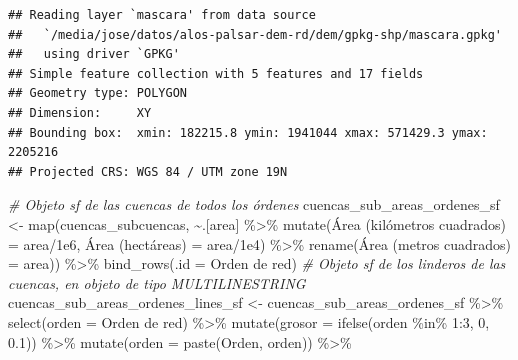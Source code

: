 \documentclass[spanish]{article}
\newenvironment{Shaded}{\begin{snugshade}}{\end{snugshade}}
\newcommand{\AttributeTok}[1]{\textcolor[rgb]{0.77,0.63,0.00}{#1}}
\newcommand{\CommentTok}[1]{\textcolor[rgb]{0.56,0.35,0.01}{\textit{#1}}}
\newcommand{\DecValTok}[1]{\textcolor[rgb]{0.00,0.00,0.81}{#1}}
\newcommand{\FloatTok}[1]{\textcolor[rgb]{0.00,0.00,0.81}{#1}}
\newcommand{\FunctionTok}[1]{\textcolor[rgb]{0.00,0.00,0.00}{#1}}
\newcommand{\NormalTok}[1]{#1}
\newcommand{\OtherTok}[1]{\textcolor[rgb]{0.56,0.35,0.01}{#1}}
\newcommand{\SpecialCharTok}[1]{\textcolor[rgb]{0.00,0.00,0.00}{#1}}
\newcommand{\StringTok}[1]{\textcolor[rgb]{0.31,0.60,0.02}{#1}}
\begin{document}
\begin{verbatim}
## Reading layer `mascara' from data source 
##   `/media/jose/datos/alos-palsar-dem-rd/dem/gpkg-shp/mascara.gpkg' 
##   using driver `GPKG'
## Simple feature collection with 5 features and 17 fields
## Geometry type: POLYGON
## Dimension:     XY
## Bounding box:  xmin: 182215.8 ymin: 1941044 xmax: 571429.3 ymax: 2205216
## Projected CRS: WGS 84 / UTM zone 19N
\end{verbatim}

\begin{Shaded}
\begin{Highlighting}[]
\CommentTok{\# Objeto sf de las cuencas de todos los órdenes}
\NormalTok{cuencas\_sub\_areas\_ordenes\_sf }\OtherTok{\textless{}{-}} \FunctionTok{map}\NormalTok{(cuencas\_subcuencas, }\SpecialCharTok{\textasciitilde{}}\NormalTok{.[}\StringTok{\textquotesingle{}area\textquotesingle{}}\NormalTok{] }\SpecialCharTok{\%\textgreater{}\%}
                           \FunctionTok{mutate}\NormalTok{(}\StringTok{\textasciigrave{}}\AttributeTok{Área (kilómetros cuadrados)}\StringTok{\textasciigrave{}} \OtherTok{=}\NormalTok{ area}\SpecialCharTok{/}\FloatTok{1e6}\NormalTok{,}
                                  \StringTok{\textasciigrave{}}\AttributeTok{Área (hectáreas)}\StringTok{\textasciigrave{}} \OtherTok{=}\NormalTok{ area}\SpecialCharTok{/}\FloatTok{1e4}\NormalTok{) }\SpecialCharTok{\%\textgreater{}\%} 
                           \FunctionTok{rename}\NormalTok{(}\StringTok{\textasciigrave{}}\AttributeTok{Área (metros cuadrados)}\StringTok{\textasciigrave{}} \OtherTok{=}\NormalTok{ area)) }\SpecialCharTok{\%\textgreater{}\%} 
  \FunctionTok{bind\_rows}\NormalTok{(}\AttributeTok{.id =} \StringTok{\textquotesingle{}Orden de red\textquotesingle{}}\NormalTok{)}
\CommentTok{\# Objeto sf de los linderos de las cuencas, en objeto de tipo MULTILINESTRING}
\NormalTok{cuencas\_sub\_areas\_ordenes\_lines\_sf }\OtherTok{\textless{}{-}}\NormalTok{ cuencas\_sub\_areas\_ordenes\_sf }\SpecialCharTok{\%\textgreater{}\%} 
  \FunctionTok{select}\NormalTok{(}\AttributeTok{orden =} \StringTok{\textasciigrave{}}\AttributeTok{Orden de red}\StringTok{\textasciigrave{}}\NormalTok{) }\SpecialCharTok{\%\textgreater{}\%} 
  \FunctionTok{mutate}\NormalTok{(}\AttributeTok{grosor =} \FunctionTok{ifelse}\NormalTok{(orden }\SpecialCharTok{\%in\%} \DecValTok{1}\SpecialCharTok{:}\DecValTok{3}\NormalTok{, }\DecValTok{0}\NormalTok{, }\FloatTok{0.1}\NormalTok{)) }\SpecialCharTok{\%\textgreater{}\%} 
  \FunctionTok{mutate}\NormalTok{(}\AttributeTok{orden =} \FunctionTok{paste}\NormalTok{(}\StringTok{\textquotesingle{}Orden\textquotesingle{}}\NormalTok{, orden)) }\SpecialCharTok{\%\textgreater{}\%} 

\end{Highlighting}
\end{Shaded}
\end{document}

